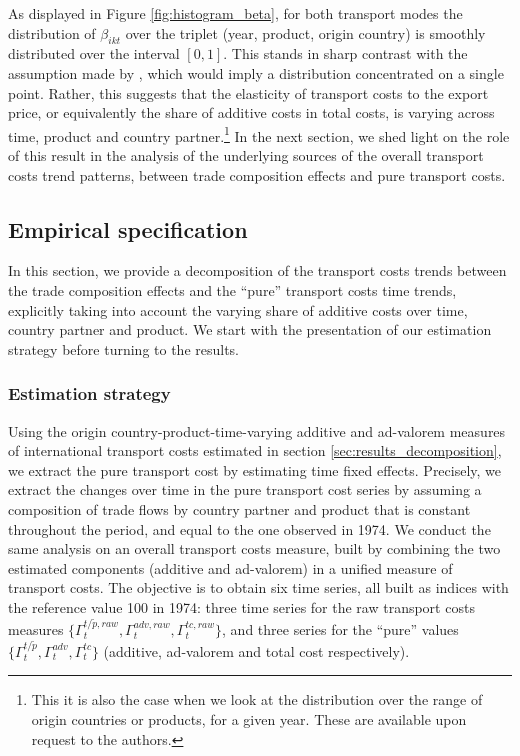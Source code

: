 \documentclass[a4paper,11pt]{article}
\begin{document}
As displayed in Figure \ref{fig:histogram_beta}, for both transport modes the distribution of $\beta_{ikt}$ over the triplet (year, product, origin country) is smoothly distributed over the interval $[0,1]$.
This stands in sharp contrast with the assumption made by \cite{hummels2007}, which would imply a distribution concentrated on a single point.
Rather, this suggests that the elasticity of transport costs to the export price, or equivalently the share of additive costs in total costs, is varying across time, product and country partner.\footnote{This it is also the case when we look at the distribution over the range of origin countries or products, for a given year.
These are available upon request to the authors.} In the next section, we shed light on the role of this result in the analysis of the underlying sources of the overall transport costs trend patterns, between trade composition effects and pure transport costs.

\subsection{Empirical specification}

In this section, we provide a decomposition of the transport costs trends between the trade composition effects and the ``pure'' transport costs time trends, explicitly taking into account the varying share of additive costs over time, country partner and product. We start with the presentation of our estimation strategy before turning to the results.

\subsubsection{Estimation strategy}

Using the origin country-product-time-varying additive and ad-valorem measures of international transport costs %
estimated in section \ref{sec:results_decomposition}, we extract the pure transport cost by estimating time fixed effects.
Precisely, we extract the changes over time in the pure transport cost series by assuming a composition of trade flows by country partner and product that is constant throughout the period, and equal to the one observed in 1974. We conduct the same analysis on an overall transport costs measure, built by combining the two estimated components (additive and ad-valorem) in a unified measure of transport costs. The objective is to obtain six time series, all built as indices with the reference value 100 in 1974: three time series for the raw transport costs measures $\{\Gamma^{t/\widetilde{p}, raw}_t, \Gamma^{adv, raw}_t, \Gamma^{tc, raw}_t \}$, and three series for the ``pure'' values $\{\Gamma^{t/\widetilde{p}}_t, \Gamma^{adv}_t, \Gamma^{tc}_t \}$ (additive, ad-valorem and total cost respectively).
\end{document}
